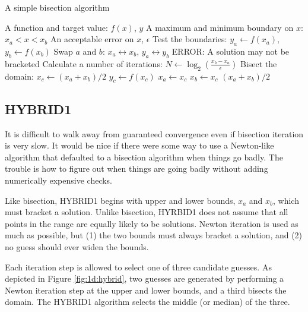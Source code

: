 \documentclass{article}
\begin{document}
\begin{algorithm}
\caption{A simple bisection algorithm}\label{alg:bisection}
\begin{algorithmic}
\REQUIRE A function and target value: $f(x)$, $y$
\REQUIRE A maximum and minimum boundary on $x$: $x_a < x <x_b$
\REQUIRE An acceptable error on $x$, $\epsilon$
\STATE Test the boundaries:
\STATE $y_a \leftarrow f(x_a)$, $y_b \leftarrow f(x_b)$
\STATE Swap $a$ and $b$:
\STATE $x_a \leftrightarrow x_b$, $y_a \leftrightarrow y_b$
\ENDIF
{}
\RETURN ERROR: A solution may not be bracketed
\ENDIF
\STATE Calculate a number of iterations:
\STATE $N \leftarrow \log_2 \left(\frac{x_b-x_a}{\epsilon}\right)$
\STATE Bisect the domain:
\STATE $x_c \leftarrow (x_a + x_b)/2$
\STATE $y_c \leftarrow f(x_c)$
\STATE $x_a \leftarrow x_c$
\ELSE
\STATE $x_b \leftarrow x_c$
\ENDIF
\ENDFOR
\RETURN $(x_a + x_b)/2$
\end{algorithmic}
\end{algorithm}

\subsection{HYBRID1}

It is difficult to walk away from guaranteed convergence even if bisection iteration is very slow.  It would be nice if there were some way to use a Newton-like algorithm that defaulted to a bisection algorithm when things go badly.  The trouble is how to figure out when things are going badly without adding numerically expensive checks.

Like bisection, HYBRID1 begins with upper and lower bounds, $x_a$ and $x_b$, which must bracket a solution.  Unlike bisection, HYRBID1 does not assume that all points in the range are equally likely to be solutions.  Newton iteration is used as much as possible, but (1) the two bounds must always bracket a solution, and (2) no guess should ever widen the bounds.

Each iteration step is allowed to select one of three candidate guesses.  As depicted in Figure \ref{fig:1d:hybrid}, two guesses are generated by performing a Newton iteration step at the upper and lower bounds, and a third bisects the domain.  The HYBRID1 algorithm selects the middle (or median) of the three.  
\end{document}
